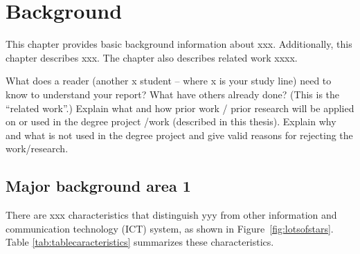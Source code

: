 \chapter{Background}
\label{ch:background}

This chapter provides basic background information about xxx. Additionally, this chapter describes xxx. The chapter also describes related work xxxx.

What does a reader (another x student -- where x is your study line) need to know to understand your report?
What have others already done? (This is the “related work”.) Explain what and
how prior work / prior research will be applied on or used in the degree
project /work (described in this thesis). Explain why and what is not used in
the degree project and give valid reasons for rejecting the work/research.


\section{Major background area 1}
There are xxx characteristics that distinguish yyy from other information and communication technology (ICT) system, as shown in Figure~\ref{fig:lotsofstars}. Table \ref{tab:tablecaracteristics} summarizes these characteristics.




